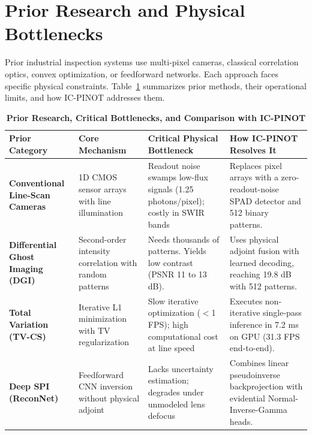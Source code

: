 \documentclass[10pt,a4paper]{article}
\begin{document}
\section{Prior Research and Physical Bottlenecks}
Prior industrial inspection systems use multi-pixel cameras, classical correlation optics, convex optimization, or feedforward networks. Each approach faces specific physical constraints. Table~\ref{tab:prior_research} summarizes prior methods, their operational limits, and how IC-PINOT addresses them.

\begin{table}[h]
\centering
\small
\caption{\textbf{Prior Research, Critical Bottlenecks, and Comparison with IC-PINOT}}
\label{tab:prior_research}
\begin{tabular}{p{2.8cm}p{3.4cm}p{4.2cm}p{4.8cm}}
\toprule
\textbf{Prior Category} & \textbf{Core Mechanism} & \textbf{Critical Physical Bottleneck} & \textbf{How IC-PINOT Resolves It} \\
\midrule
\textbf{Conventional Line-Scan Cameras} & 1D CMOS sensor arrays with line illumination & Readout noise swamps low-flux signals (1.25 photons/pixel); costly in SWIR bands & Replaces pixel arrays with a zero-readout-noise SPAD detector and 512 binary patterns. \\
\midrule
\textbf{Differential Ghost Imaging (DGI)} & Second-order intensity correlation with random patterns & Needs thousands of patterns. Yields low contrast (PSNR 11 to 13 dB). & Uses physical adjoint fusion with learned decoding, reaching 19.8 dB with 512 patterns. \\
\midrule
\textbf{Total Variation (TV-CS)} & Iterative L1 minimization with TV regularization & Slow iterative optimization ($<$1 FPS); high computational cost at line speed & Executes non-iterative single-pass inference in 7.2 ms on GPU (31.3 FPS end-to-end). \\
\midrule
\textbf{Deep SPI (ReconNet)} & Feedforward CNN inversion without physical adjoint & Lacks uncertainty estimation; degrades under unmodeled lens defocus & Combines linear pseudoinverse backprojection with evidential Normal-Inverse-Gamma heads. \\
\bottomrule
\end{tabular}
\end{table}
\end{document}
